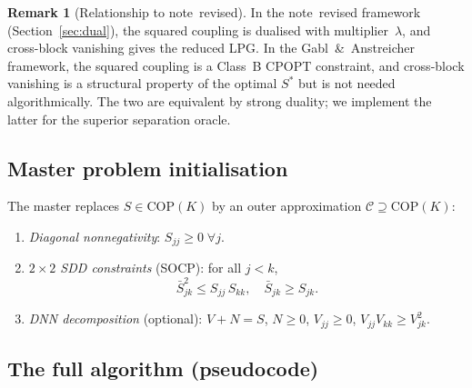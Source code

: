 \documentclass[11pt]{article}
\theoremstyle{definition}
\newtheorem{remark}{Remark}
\begin{document}
\begin{remark}[Relationship to note~revised]
In the note~revised framework
(Section~\ref{sec:dual}), the squared coupling is dualised with
multiplier~$\lambda$, and cross-block vanishing gives the reduced LPG.
In the Gabl~\&~Anstreicher framework, the squared coupling is a Class~B
CPOPT constraint, and cross-block vanishing is a structural property of
the optimal $S^{*}$ but is not needed algorithmically.  The two are
equivalent by strong duality; we implement the latter for the superior
separation oracle.
\end{remark}

\subsection{Master problem initialisation}
\label{sec:master-init}

The master replaces $S\in\mathrm{COP}(K)$ by an outer approximation
$\mathcal{C}\supseteq\mathrm{COP}(K)$:
\begin{enumerate}[leftmargin=1.6em]
\item \emph{Diagonal nonnegativity}: $S_{jj}\ge0\;\forall j$.
\item \emph{$2\times2$ SDD constraints} (SOCP): for all $j<k$,
  \begin{equation}
  \bar S_{jk}^{2}\le S_{jj}\,S_{kk},\quad \bar S_{jk}\ge S_{jk}.
  \label{eq:sdd}
  \end{equation}
\item \emph{DNN decomposition} (optional): $V+N=S$, $N\ge0$,
  $V_{jj}\ge0$, $V_{jj}V_{kk}\ge V_{jk}^{2}$.
\end{enumerate}

\subsection{The full algorithm (pseudocode)}
\label{sec:full-algo}
\end{document}
